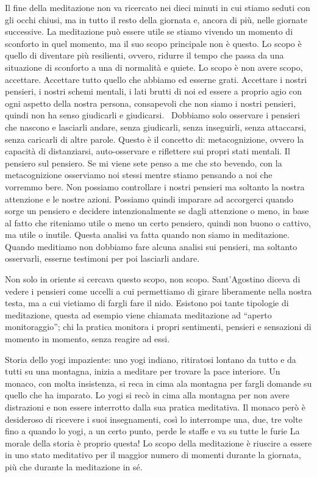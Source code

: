 \documentclass[12pt]{book} %
\begin{document}
Il fine della meditazione non va ricercato nei dieci minuti in cui stiamo seduti con gli occhi chiusi, ma in tutto il
resto della giornata e, ancora di più, nelle giornate successive. La meditazione può essere utile se stiamo vivendo un
momento di sconforto in quel momento, ma il suo scopo principale non è questo. Lo scopo è quello di diventare più
resilienti, ovvero, ridurre il tempo che passa da una situazione di sconforto a una di normalità e quiete. Lo scopo è
non avere scopo, accettare. Accettare tutto quello che abbiamo ed esserne grati. Accettare i nostri pensieri, i nostri
schemi mentali, i lati brutti di noi ed essere a proprio agio con ogni aspetto della nostra persona, consapevoli che
non siamo i nostri pensieri, quindi non ha senso giudicarli e giudicarsi. \ Dobbiamo solo osservare i pensieri che
nascono e lasciarli andare, senza giudicarli, senza inseguirli, senza attaccarsi, senza caricarli di altre parole.
Questo è il concetto di: metacognizione, ovvero la capacità di distanziarsi, auto-osservare e riflettere sui propri
stati mentali. Il pensiero sul pensiero. Se mi viene sete penso a me che sto bevendo, con la metacognizione osserviamo
noi stessi mentre stiamo pensando a noi che vorremmo bere. Non possiamo controllare i nostri pensieri ma soltanto la
nostra attenzione e le nostre azioni. Possiamo quindi imparare ad accorgerci quando sorge un pensiero e decidere
intenzionalmente se dagli attenzione o meno, in base al fatto che riteniamo utile o meno un certo pensiero, quindi non
buono o cattivo, ma utile o inutile. Questa analisi va fatta quando non siamo in meditazione. Quando meditiamo non
dobbiamo fare alcuna analisi sui pensieri, ma soltanto osservarli, esserne testimoni per poi lasciarli andare.

Non solo in oriente si cercava questo scopo, non scopo. Sant'Agostino diceva di vedere i pensieri come uccelli a cui
permettiamo di girare liberamente nella nostra testa, ma a cui vietiamo di fargli fare il nido. Esistono poi tante
tipologie di meditazione, questa ad esempio viene chiamata meditazione ad “aperto monitoraggio”; chi la pratica
monitora i propri sentimenti, pensieri e sensazioni di momento in momento, senza reagire ad essi. 

\begin{mdframed}[linewidth=1pt]
Storia dello yogi impaziente: uno yogi indiano, ritiratosi lontano da tutto e da tutti su una montagna, inizia a
meditare per trovare la pace interiore. Un monaco, con molta insistenza, si reca in cima ala montagna per fargli
domande su quello che ha imparato. Lo yogi si recò in cima alla montagna per non avere distrazioni e non essere
interrotto dalla sua pratica meditativa. Il monaco però è desideroso di ricevere i suoi insegnamenti, così lo
interrompe una, due, tre volte fino a quando lo yogi, a un certo punto, perde le staffe e va su tutte le furie La
morale della storia è proprio questa! Lo scopo della meditazione è riuscire a essere in uno stato meditativo per il
maggior numero di momenti durante la giornata, più che durante la meditazione in sé.
\end{mdframed}
\end{document}
